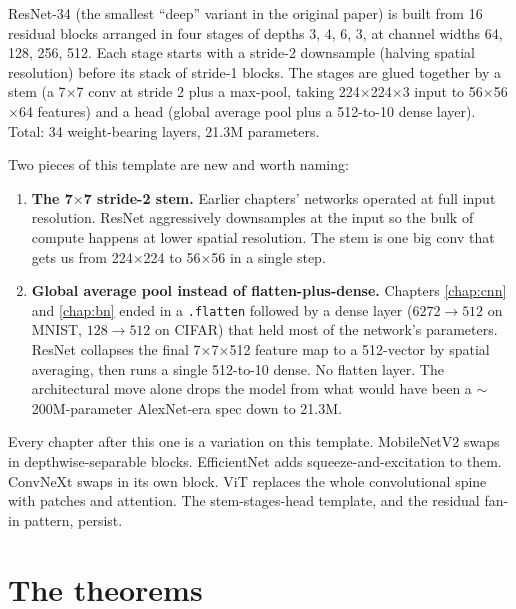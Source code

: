 
ResNet-34 (the smallest ``deep'' variant in the original paper)
is built from 16 residual blocks arranged in four stages of
depths 3, 4, 6, 3, at channel widths 64, 128, 256, 512. Each
stage starts with a stride-2 downsample (halving spatial
resolution) before its stack of stride-1 blocks. The stages are
glued together by a stem (a 7$\times$7 conv at stride 2 plus a
max-pool, taking 224$\times$224$\times$3 input to 56$\times$56$\times$64
features) and a head (global average pool plus a 512-to-10
dense layer). Total: 34 weight-bearing layers, 21.3M parameters.

Two pieces of this template are new and worth naming:

\begin{enumerate}
\item \textbf{The 7$\times$7 stride-2 stem.} Earlier chapters'
  networks operated at full input resolution. ResNet aggressively
  downsamples at the input so the bulk of compute happens at lower
  spatial resolution. The stem is one big conv that gets us from
  224$\times$224 to 56$\times$56 in a single step.

\item \textbf{Global average pool instead of flatten-plus-dense.}
  Chapters \ref{chap:cnn} and \ref{chap:bn} ended in a
  \texttt{.flatten} followed by a dense layer ($6272 \to 512$ on MNIST,
  $128 \to 512$ on CIFAR) that held most of the network's parameters.
  ResNet collapses
  the final 7$\times$7$\times$512 feature map to a 512-vector
  by spatial averaging, then runs a single 512-to-10 dense. No
  flatten layer. The architectural move alone drops the model
  from what would have been a $\sim$200M-parameter AlexNet-era
  spec down to 21.3M.
\end{enumerate}

Every chapter after this one is a variation on this template.
MobileNetV2 swaps in depthwise-separable blocks. EfficientNet adds
squeeze-and-excitation to them. ConvNeXt swaps in its own block. ViT
replaces the whole convolutional spine with patches and attention. The stem-stages-head template, and the residual
fan-in pattern, persist.

\section{The theorems}



